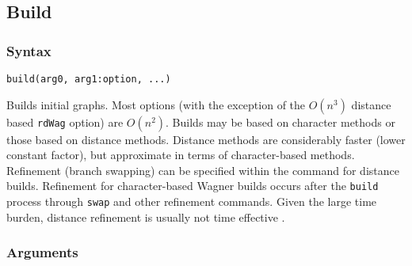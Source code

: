 \subsection{Build}
	\subsubsection{Syntax}
		\texttt{build(arg0, arg1:option, ...)}
	
	\begin{phygdescription}
		{Builds initial graphs. Most options (with the exception of the $O(n^3)$ distance based 
		\texttt{rdWag} option) 	are $O(n^2)$. Builds may be based on character methods or those 
		based on distance methods. Distance methods are considerably faster (lower constant 
		factor), but approximate in terms of character-based methods. Refinement (branch swapping) 
		can be specified within the command for distance builds. Refinement for character-based 
		Wagner builds occurs after the \texttt{build} process through \texttt{swap} and other refinement 
		commands. Given the large time burden, distance refinement is usually not time effective 
		\citep{Wheeler2021}.}
	\end{phygdescription}
		
	\subsubsection{Arguments}

